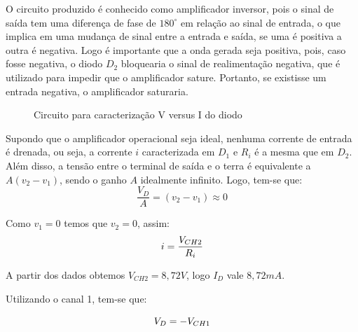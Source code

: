 \documentclass[a4paper]{article} %
\begin{document}
O circuito produzido é conhecido como amplificador inversor, pois o sinal de saída tem uma diferença de fase de $180^{\circ}$ em relação ao sinal de entrada, o que implica em uma mudança de sinal entre a entrada e saída, se uma é positiva a outra é negativa. Logo é importante que a onda gerada seja positiva, pois, caso fosse negativa, o diodo $D_2$ bloquearia o sinal de realimentação negativa, que é utilizado para impedir que o amplificador sature. Portanto, se existisse um entrada negativa, o amplificador saturaria.

\vspace{3mm}
\begin{figure}[h]
\centerline{}
\caption{Circuito para caracterização V versus I do diodo \label{circ:1}}
\end{figure}

Supondo que o amplificador operacional seja ideal, nenhuma corrente de entrada é drenada, ou seja, a corrente $i$ caracterizada em $D_1$ e $R_i$ é a mesma que em $D_2$. Além disso, a tensão entre o terminal de saída e o terra é equivalente a $A(v_2-v_1)$, sendo o ganho $A$ idealmente infinito. Logo, tem-se que:
\begin{equation}
\frac{V_D}{A}=(v_2-v_1)\approx0
\end{equation}

Como $v_1=0$ temos que $v_2=0$, assim:
\begin{equation}
i=\frac{V_{CH2}}{R_{i}}\\
\end{equation}

A partir dos dados obtemos $V_{CH2}=8,72V$, logo $I_D$ vale $8,72mA$.

Utilizando o canal 1, tem-se que:  

\begin{equation}
V_D=-V_{CH1}\\
\end{equation}
\end{document}
